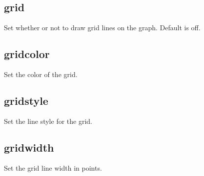 \documentclass[letterpaper,10pt,english]{sphinxmanual}
\begin{document}
\subsection{grid}
\label{\detokenize{plot_control_cmds:grid}}
Set whether or not to draw grid lines on the graph. Default is off.

\begin{sphinxVerbatim}[commandchars=\\\{\}]
\PYG{p}{[}\PYG{p}{]}    
\end{sphinxVerbatim}


\subsection{gridcolor}
\label{\detokenize{plot_control_cmds:gridcolor}}
Set the color of the grid.

\begin{sphinxVerbatim}[commandchars=\\\{\}]
\PYG{p}{[}\PYG{p}{]}  
\end{sphinxVerbatim}


\subsection{gridstyle}
\label{\detokenize{plot_control_cmds:gridstyle}}
Set the line style for the grid.

\begin{sphinxVerbatim}[commandchars=\\\{\}]
\PYG{p}{[}\PYG{p}{]}         
\end{sphinxVerbatim}


\subsection{gridwidth}
\label{\detokenize{plot_control_cmds:gridwidth}}
Set the grid line width in points.

\begin{sphinxVerbatim}[commandchars=\\\{\}]
\PYG{p}{[}\PYG{p}{]}  
\end{sphinxVerbatim}
\end{document}
